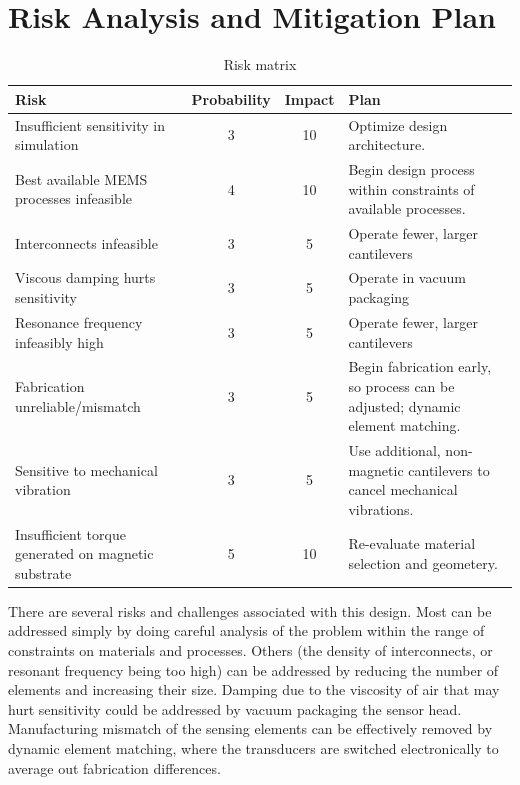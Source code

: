 \section{Risk Analysis and Mitigation Plan}

\begin{table}[h!]
\centering
\begin{tabularx}{.85\textwidth}{|X||c|c|X|}
    \hline
    Risk & Probability & Impact & Plan\\
    \hline
    \hline
    Insufficient sensitivity in simulation & 3 & 10 & Optimize design architecture. \\
    \hline
    Best available MEMS processes infeasible & 4 & 10 & Begin design process within constraints of available processes. \\
    \hline
    Interconnects infeasible & 3 & 5 & Operate fewer, larger cantilevers \\
    \hline
    Viscous damping hurts sensitivity & 3 & 5 & Operate in vacuum packaging \\
    \hline
    Resonance frequency infeasibly high & 3  & 5 & Operate fewer, larger cantilevers \\
    \hline
    Fabrication unreliable/mismatch & 3 & 5 & Begin fabrication early, so process can be adjusted; dynamic element matching. \\
    \hline
    Sensitive to mechanical vibration & 3 & 5 & Use additional, non-magnetic cantilevers to cancel mechanical vibrations. \\
    \hline
    Insufficient torque generated on magnetic substrate & 5 & 10 & Re-evaluate material selection and geometery. \\
    \hline
\end{tabularx}
\caption{Risk matrix}
\label{table:risk}
\end{table}

There are several risks and challenges associated with this design. Most can be addressed simply by doing careful analysis of the problem within the range of constraints on materials and processes. Others (the density of interconnects, or resonant frequency being too high) can be addressed by reducing the number of elements and increasing their size. Damping due to the viscosity of air that may hurt sensitivity could be addressed by vacuum packaging the sensor head. Manufacturing mismatch of the sensing elements can be effectively removed by dynamic element matching, where the transducers are switched electronically to average out fabrication differences.


